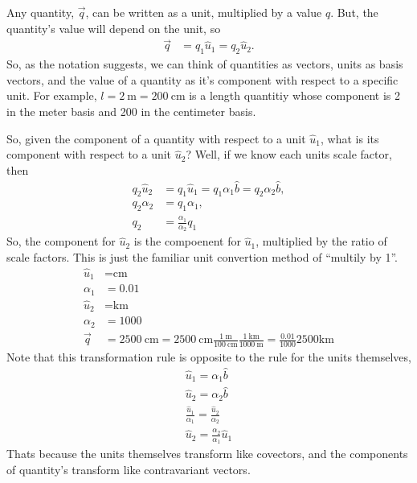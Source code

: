 \documentclass[letterpaper,10pt]{article}
\begin{document}
Any quantity, $\vec{q}$, can be written as a unit, multiplied by a value $q$. But, the quantity's value will depend on the unit, so
\begin{align}
        \label{eq:quanity_as_vec}
        \vec{q} &= q_1 \hat{u}_1 =  q_2 \hat{u}_2.
\end{align}
So, as the notation suggests,  we can think of quantities as vectors, units as basis vectors, and the value of a quantity as it's component with respect to a specific unit. For example,
$l = \SI{2}{\meter} = \SI{200}{\centi\meter}$ is a length quantitiy whose component is 2 in the meter basis and 200 in the centimeter basis.

So, given the component of a quantity with respect to a unit $\hat{u}_1$, what is its component with respect to a unit $\hat{u}_2$? Well,
if we know each units scale factor, then
\begin{align}
        q_2 \hat{u}_2 &=  q_1 \hat{u}_1 = q_1 \alpha_1 \hat{b} = q_2 \alpha_2 \hat{b}, \\
        q_2 \alpha_2 &= q_1 \alpha_1, \\
        q_2 &= \frac{\alpha_1}{\alpha_2} q_1
\end{align}
So, the component for $\hat{u}_2$ is the compoenent for $\hat{u}_1$, multiplied by the ratio of scale factors. This is just the familiar unit convertion method of ``multily by 1''.
\begin{align}
        \hat{u}_1 &= \si{\centi\meter} \\
        \alpha_1 &= 0.01 \\
        \hat{u}_2 &= \si{\kilo\meter} \\
        \alpha_2 &= 1000 \\
        \vec{q} &= \SI{2500}{\centi\meter} = \SI{2500}{\centi\meter} \frac{\SI{1}{\meter}}{\SI{100}{\centi\meter}}\frac{\SI{1}{\kilo\meter}}{\SI{1000}{\meter}} = \frac{0.01}{1000} 2500 \si{\kilo\meter}
\end{align}
Note that this transformation rule is opposite to the rule for the units themselves,
\begin{align}
        \hat{u}_1 = \alpha_1 \hat{b} \\
        \hat{u}_2 = \alpha_2 \hat{b} \\
        \frac{\hat{u}_1}{\alpha_1} = \frac{\hat{u}_2}{\alpha_2}\\
        \hat{u}_2 = \frac{\alpha_2}{\alpha_1} \hat{u}_1
\end{align}
Thats because the units themselves transform like covectors, and the components of quantity's transform like contravariant vectors.
\end{document}
